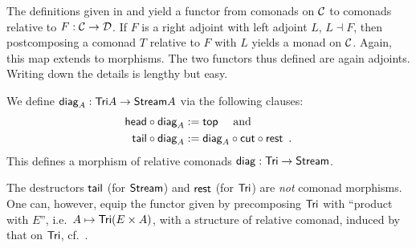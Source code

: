 \documentclass{amsart}
\begin{document}
\begin{remark}
 The definitions given in  and  yield a functor from 
 comonads on ${\mathcal{C}}$ to comonads relative to $F:{\mathcal{C}}\to\mathcal{D}$. 
 If $F$ is a right adjoint with left adjoint $L$, $L\dashv F$, then postcomposing a comonad $T$ relative to $F$ with $L$
 yields a monad on ${\mathcal{C}}$. Again, this map extends to morphisms.
 The two functors thus defined are again adjoints.
 Writing down the details is lengthy but easy.
\end{remark}



\begin{example}\label{ex_diag}

We define $\mathsf{diag}_A : \mathsf{Tri} A \to \mathsf{Stream} A$ via the following clauses:
    \begin{align} {\ensuremath{\mathsf{head}}} \circ {\ensuremath{\mathsf{diag}}_A} &:= \mathsf{top} \quad\text{ and } \notag\\
                  {\mathsf{tail}} \circ {\ensuremath{\mathsf{diag}}_A} &:= {\mathsf{diag}_A} \circ {\ensuremath{{\mathsf{cut}} \circ {\ensuremath{\mathsf{rest}}}}} \enspace . \label{eq:diag}
    \end{align}
 This defines a morphism of relative comonads $\mathsf{diag} : \mathsf{Tri} \to \mathsf{Stream}$.
\end{example}




\begin{remark}
 The destructors $\mathsf{tail}$ (for $\mathsf{Stream}$) and $\mathsf{rest}$ (for $\mathsf{Tri}$) are \emph{not} comonad morphisms.
 One can, however, equip the functor given by precomposing $\mathsf{Tri}$ with \enquote{product with $E$}, i.e.\
 $A \mapsto \mathsf{Tri} (E\times A)$, with a structure of relative comonad, induced by that
 on $\mathsf{Tri}$, cf.\ \Cref{product_comonad}.
\end{remark}
\end{document}
